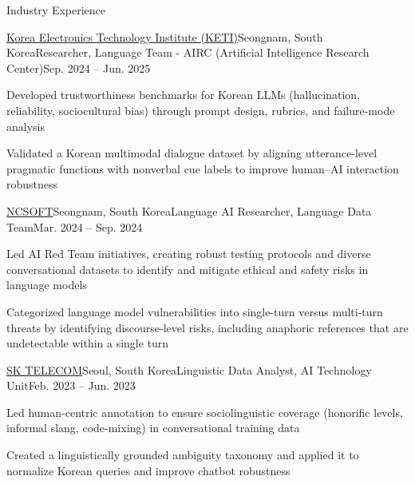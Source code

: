 \documentclass[
	11pt, %
]{resume} %
\begin{document}
\begin{rSection}{Industry Experience}

	\begin{rSubsection}{\href{https://www.keti.re.kr/eng/main/main.php}{Korea Electronics Technology Institute (KETI)}}{Seongnam, South Korea}{Researcher, Language Team - AIRC (Artificial Intelligence Research Center)}{Sep. 2024 -- Jun. 2025}
		\item Developed trustworthiness benchmarks for Korean LLMs (hallucination, reliability, sociocultural bias) through prompt design, rubrics, and failure-mode analysis
        \item Validated a Korean multimodal dialogue dataset by aligning utterance-level pragmatic functions with nonverbal cue labels to improve human–AI interaction robustness
	\end{rSubsection}


	\begin{rSubsection}{\href{https://nc-ai.com/en}{NCSOFT}}{Seongnam, South Korea}{Language AI Researcher, Language Data Team}{Mar. 2024 -- Sep. 2024}
		\item Led AI Red Team initiatives, creating robust testing protocols and diverse conversational datasets to identify and mitigate ethical and safety risks in language models
		\item Categorized language model vulnerabilities into single-turn versus multi-turn threats by identifying discourse-level risks, including anaphoric references that are undetectable within a single turn
	\end{rSubsection}


	\begin{rSubsection}{\href{https://www.sktelecom.com/index_en.html}{SK TELECOM}}{Seoul, South Korea}{Linguistic Data Analyst, AI Technology Unit}{Feb. 2023 -- Jun. 2023}
		\item Led human-centric annotation to ensure sociolinguistic coverage (honorific levels, informal slang, code-mixing) in conversational training data
		\item Created a linguistically grounded ambiguity taxonomy and applied it to normalize Korean queries and improve chatbot robustness
	\end{rSubsection}

\end{rSection}
\end{document}
